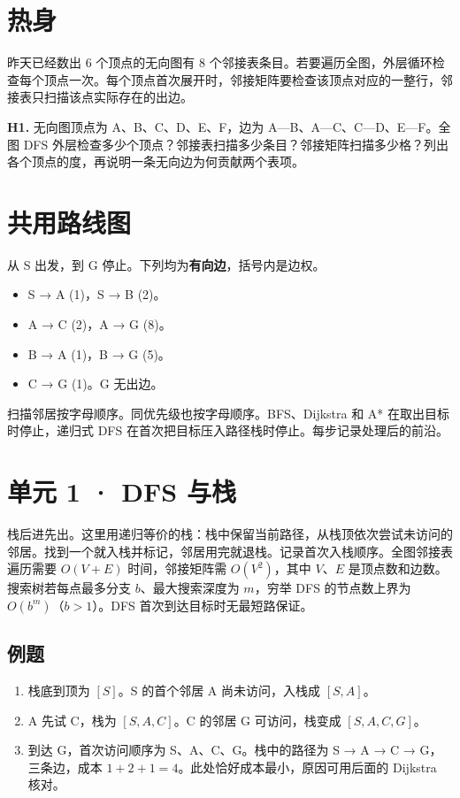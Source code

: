 \documentclass[UTF8,a4paper,11pt]{ctexart}
\begin{document}
\section{热身}
昨天已经数出 6 个顶点的无向图有 8 个邻接表条目。若要遍历全图，外层循环检查每个顶点一次。每个顶点首次展开时，邻接矩阵要检查该顶点对应的一整行，邻接表只扫描该点实际存在的出边。

\textbf{H1.} 无向图顶点为 A、B、C、D、E、F，边为 A—B、A—C、C—D、E—F。全图 DFS 外层检查多少个顶点？邻接表扫描多少条目？邻接矩阵扫描多少格？列出各个顶点的度，再说明一条无向边为何贡献两个表项。

\section{共用路线图}
从 S 出发，到 G 停止。下列均为\textbf{有向边}，括号内是边权。

\begin{itemize}
\item S → A (1)，S → B (2)。
\item A → C (2)，A → G (8)。
\item B → A (1)，B → G (5)。
\item C → G (1)。G 无出边。
\end{itemize}
扫描邻居按字母顺序。同优先级也按字母顺序。BFS、Dijkstra 和 A* 在取出目标时停止，递归式 DFS 在首次把目标压入路径栈时停止。每步记录处理后的前沿。

\clearpage
\section{单元 1 · DFS 与栈}
栈后进先出。这里用递归等价的栈：栈中保留当前路径，从栈顶依次尝试未访问的邻居。找到一个就入栈并标记，邻居用完就退栈。记录首次入栈顺序。全图邻接表遍历需要 $O(V+E)$ 时间，邻接矩阵需 $O(V^2)$，其中 $V$、$E$ 是顶点数和边数。搜索树若每点最多分支 $b$、最大搜索深度为 $m$，穷举 DFS 的节点数上界为 $O(b^m)$（$b>1$）。DFS 首次到达目标时无最短路保证。

\subsection{例题}
\begin{enumerate}
\item 栈底到顶为 $[S]$。S 的首个邻居 A 尚未访问，入栈成 $[S,A]$。
\item A 先试 C，栈为 $[S,A,C]$。C 的邻居 G 可访问，栈变成 $[S,A,C,G]$。
\item 到达 G，首次访问顺序为 S、A、C、G。栈中的路径为 S → A → C → G，三条边，成本 $1+2+1=4$。此处恰好成本最小，原因可用后面的 Dijkstra 核对。
\end{enumerate}
\end{document}
